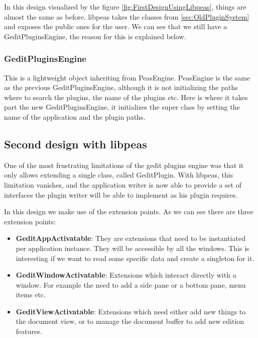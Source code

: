 
In this design visualized by the figure \ref{fig:FirstDesignUsingLibpeas}, things are almost the same as before. libpeas takes the classes from \ref{sec:OldPluginSystem} and exposes the public ones for the user. We can see that we still have a GeditPluginsEngine, the reason for this is explained below.

\subsubsection{GeditPluginsEngine}

This is a lightweight object inheriting from PeasEngine. PeasEngine is the same as the previous GeditPluginsEngine, although it is not initializing the paths where to search the plugins, the name of the plugins etc. Here is where it takes part the new GeditPluginsEngine, it initializes the super class by setting the name of the application and the plugin paths.

\subsection{Second design with libpeas}


One of the most frustrating limitations of the gedit plugins engine was that it only allows extending a single class, called GeditPlugin. With libpeas, this limitation vanishes, and the application writer is now able to provide a set of interfaces the plugin writer will be able to implement as his plugin requires.

In this design we make use of the extension points. As we can see there are three extension points:
\begin{itemize}
  \item \textbf{GeditAppActivatable}: They are extensions that need to be instantiated per application instance. They will be accessible by all the windows. This is interesting if we want to read some specific data and create a singleton for it.
  \item \textbf{GeditWindowActivatable}: Extensions which interact directly with a window. For example the need to add a side pane or a bottom pane, menu items etc.
  \item \textbf{GeditViewActivatable}: Extensions which need either add new things to the document view, or to manage the document buffer to add new edition features.
\end{itemize}

